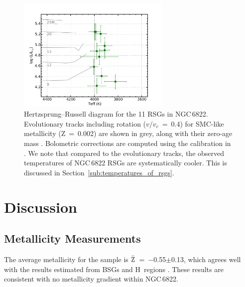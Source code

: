 \begin{figure}
 \centering
\includegraphics[width=0.65\textwidth]{ngc6822/N6822_HRD_thesis}
\caption[NGC\,6822 Hertzsprung--Russell diagram for RSGs]{
Hertzsprung--Russell diagram for the 11 RSGs in NGC\,6822.
Evolutionary tracks including rotation
($v/v_{c}$~=~0.4) for SMC-like metallicity (Z~=~0.002)
are shown in grey, along with their zero-age mass
\protect\citep{2013A&A...558A.103G}.
Bolometric corrections are computed using the calibration in
\protect\cite{2013ApJ...767....3D}.
We note that compared to the evolutionary tracks,
the observed temperatures of NGC\,6822 RSGs are systematically cooler.
This is discussed in Section~\ref{sub:temperatures_of_rsgs}.
}
\label{fig:6822HRD}
\end{figure}



\section{Discussion} %
\label{sec:ngc6822disc}

\subsection{Metallicity Measurements} %
\label{sub:metallicity_measurements}

The average metallicity for the sample is $\bar{\rm Z}$~=~$-$0.55$\pm$0.13,
which agrees well with the results estimated from BSGs
\citep{1999A&A...352L..40M,2001ApJ...547..765V,2002PhDT.........3P} and H\,\2 regions
\citep{2006ApJ...642..813L}.
These results are consistent with no metallicity gradient within NGC\,6822.


